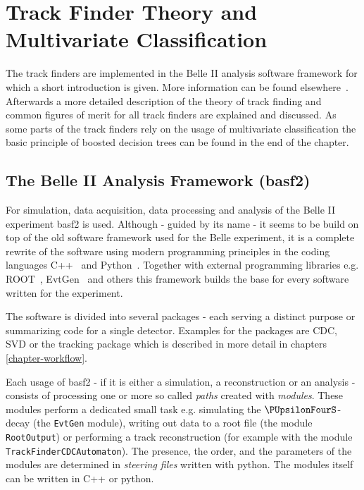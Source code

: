 \chapter{Track Finder Theory and Multivariate Classification} \label{chapter-theory}

The track finders are implemented in the Belle II analysis software framework for which a short introduction is given. More information can be found elsewhere~\cite{tdr}. Afterwards a more detailed description of the theory of track finding and common figures of merit for all track finders are explained and discussed. As some parts of the track finders rely on the usage of multivariate classification the basic principle of boosted decision trees can be found in the end of the chapter.

\section{The Belle II Analysis Framework (basf2)}

For simulation, data acquisition, data processing and analysis of the Belle II experiment basf2 is used. Although - guided by its name - it seems to be build on top of the old software framework used for the Belle experiment, it is a complete rewrite of the software using modern programming principles in the coding languages C++~\cite{cpp} and Python~\cite{python}. Together with external programming libraries e.g. ROOT~\cite{root}, EvtGen~\cite{evtgen} and others this framework builds the base for every software written for the experiment.

The software is divided into several packages - each serving a distinct purpose or summarizing code for a single detector. Examples for the packages are CDC, SVD or the tracking package which is described in more detail in chapters \ref{chapter-workflow}.

Each usage of basf2 - if it is either a simulation, a reconstruction or an analysis - consists of processing one or more so called \emph{paths} created with \emph{modules}. These modules perform a dedicated small task e.g. simulating the $\PUpsilonFourS$-decay (the \texttt{EvtGen} module), writing out data to a root file (the module \texttt{RootOutput}) or performing a track reconstruction (for example with the module \texttt{TrackFinderCDCAutomaton}). The presence, the order, and the parameters of the modules are determined in \emph{steering files} written with python. The modules itself can be written in C++ or python. 

